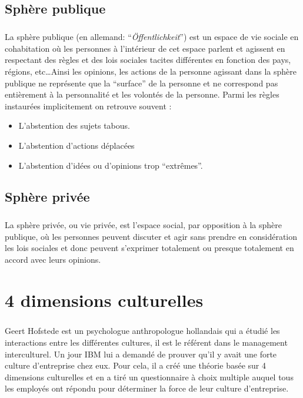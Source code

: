 \section{Sphère publique}

\paragraph{} La sphère publique (en allemand: ``\textit{Öffentlichkeit}'') est
un espace de vie sociale en cohabitation où les personnes à l'intérieur de cet
espace parlent et agissent en respectant des règles et des lois sociales
tacites différentes en fonction des pays, régions, etc\ldots Ainsi les
opinions, les actions de la personne agissant dans la sphère publique ne
représente que la ``surface'' de la personne et ne correspond pas entièrement à
la personnalité et les volontés de la personne. Parmi les règles instaurées
implicitement on retrouve souvent :

\begin{itemize}
	\item L'abstention des sujets tabous.
	\item L'abstention d'actions déplacées
	\item L'abstention d'idées ou d'opinions trop ``extrêmes''.
\end{itemize}

\section{Sphère privée}

\paragraph{} La sphère privée, ou vie privée, est l'espace social, par
opposition à la sphère publique, où les personnes peuvent discuter et agir sans
prendre en considération les lois sociales et donc peuvent s'exprimer
totalement ou presque totalement en accord avec leurs opinions.

\chapter{4 dimensions culturelles}

\paragraph{} Geert Hofstede est un psychologue anthropologue hollandais qui a
étudié les interactions entre les différentes cultures, il est le référent dans
le management interculturel. Un jour IBM lui a demandé de prouver qu'il y avait
une forte culture d'entreprise chez eux. Pour cela, il a créé une théorie basée
sur 4 dimensions culturelles et en a tiré un questionnaire à choix multiple
auquel tous les employés ont répondu pour déterminer la force de leur culture
d'entreprise.


